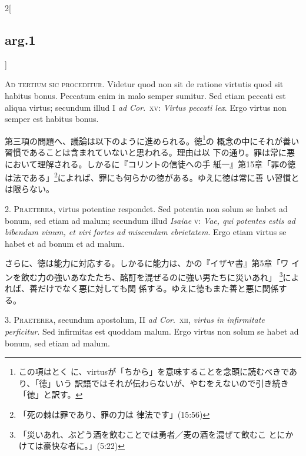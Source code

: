 \documentclass[paper=a4paper,fontsize=10pt,jafontsize=9pt,titlepage]{jlreq}
\begin{document}
\begin{paracol}{2}[\subsection{arg.1}]

{\scshape Ad tertium sic proceditur}. Videtur quod non sit de ratione
virtutis quod sit habitus bonus. Peccatum enim in malo semper
sumitur. Sed etiam peccati est aliqua virtus; secundum illud I
{\itshape ad Cor}.~{\scshape xv}: {\itshape Virtus peccati lex}. Ergo
virtus non semper est habitus bonus.

\switchcolumn

第三項の問題へ、議論は以下のように進められる。徳\footnote{この項はとく
に、virtusが「ちから」を意味することを念頭に読むべきであり、「徳」いう
訳語ではそれが伝わらないが、やむをえないので引き続き「徳」と訳す。}の
概念の中にそれが善い習慣であることは含まれていないと思われる。理由は以
下の通り。罪は常に悪において理解される。しかるに『コリントの信徒への手
紙一』第15章「罪の徳は法である」\footnote{「死の棘は罪であり、罪の力は
律法です」(15:56)}によれば、罪にも何らかの徳がある。ゆえに徳は常に善
い習慣とは限らない。


2. {\scshape Praeterea}, virtus potentiae respondet. Sed potentia non
solum se habet ad bonum, sed etiam ad malum; secundum illud {\itshape
Isaiae} {\scshape v}: {\itshape Vae, qui potentes estis ad bibendum
vinum, et viri fortes ad miscendam ebrietatem}. Ergo etiam virtus se
habet et ad bonum et ad malum.

\switchcolumn

さらに、徳は能力に対応する。しかるに能力は、かの『イザヤ書』第5章「ワ
インを飲む力の強いあなたたち、酩酊を混ぜるのに強い男たちに災いあれ」
\footnote{「災いあれ、ぶどう酒を飲むことでは勇者／麦の酒を混ぜて飲むこ
とにかけては豪快な者に。」(5:22)}によれば、善だけでなく悪に対しても関
係する。ゆえに徳もまた善と悪に関係する。


3. {\scshape Praeterea}, secundum apostolum, II {\itshape ad
Cor}.~{\scshape xii}, {\itshape virtus in infirmitate perficitur}. Sed
infirmitas est quoddam malum. Ergo virtus non solum se habet ad bonum,
sed etiam ad malum.


\end{paracol}
\end{document}
